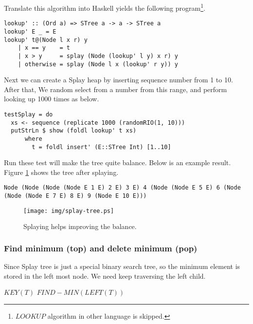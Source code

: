 \documentclass{article}
\begin{document}
Translate this algorithm into Haskell yields the following program\footnote{$LOOKUP$ algorithm in other language is skipped.}.

\lstset{language=Haskell}
\begin{lstlisting}
lookup' :: (Ord a) => STree a -> a -> STree a
lookup' E _ = E
lookup' t@(Node l x r) y
    | x == y    = t
    | x > y     = splay (Node (lookup' l y) x r) y
    | otherwise = splay (Node l x (lookup' r y)) y
\end{lstlisting}

Next we can create a Splay heap by inserting sequence number from
1 to 10. After that, We random select from a number from this range,
and perform looking up 1000 times as below.

\begin{lstlisting}
testSplay = do
  xs <- sequence (replicate 1000 (randomRIO(1, 10)))
  putStrLn $ show (foldl lookup' t xs)
      where 
        t = foldl insert' (E::STree Int) [1..10]
\end{lstlisting} %

Run these test will make the tree quite balance. Below is an example
result. Figure \ref{fig:splay-result} shows the tree after splaying.

\begin{verbatim}
Node (Node (Node (Node E 1 E) 2 E) 3 E) 4 (Node (Node E 5 E) 6 (Node 
(Node (Node E 7 E) 8 E) 9 (Node E 10 E)))
\end{verbatim}

\begin{figure}[htbp]
   \begin{center}
   	  \texttt{[image: img/splay-tree.ps]}
          \caption{Splaying helps improving the balance.} \label{fig:splay-result}
   \end{center}
\end{figure}


\subsubsection{Find minimum (top) and delete minimum (pop)}
Since Splay tree is just a special binary search tree, so the minimum
element is stored in the left most node. We need keep traversing
the left child.

\begin{algorithmic}[1]
    \State \Return $KEY(T)$
  \Else
    \State \Return $FIND-MIN(LEFT(T))$
  \EndIf
\EndFunction
\end{algorithmic}
\end{document}
